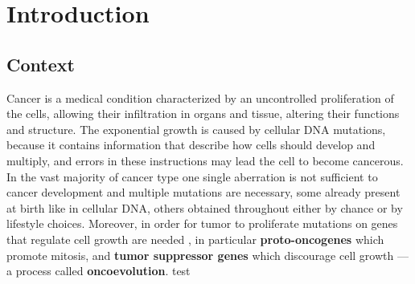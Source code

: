 
\chapter{Introduction} \label{chap:introduction}

\section{Context}

Cancer is a medical condition characterized by an uncontrolled proliferation of the cells, allowing their infiltration in organs and tissue, altering their functions and structure. The exponential growth is caused by cellular DNA mutations, because it contains information that describe how cells should develop and multiply, and errors in these instructions may lead the cell to become cancerous. In the vast majority of cancer type one single aberration is not sufficient to cancer development and multiple mutations are necessary, some already present at birth like in cellular DNA, others obtained throughout either by chance or by lifestyle choices. Moreover, in order for tumor to proliferate mutations on genes that regulate cell growth are needed \cite{Vogelstein2004}, in particular \textbf{proto-oncogenes} which promote mitosis, and \textbf{tumor suppressor genes} which discourage cell growth --- a process called \textbf{oncoevolution}. test

\cleardoublepage
